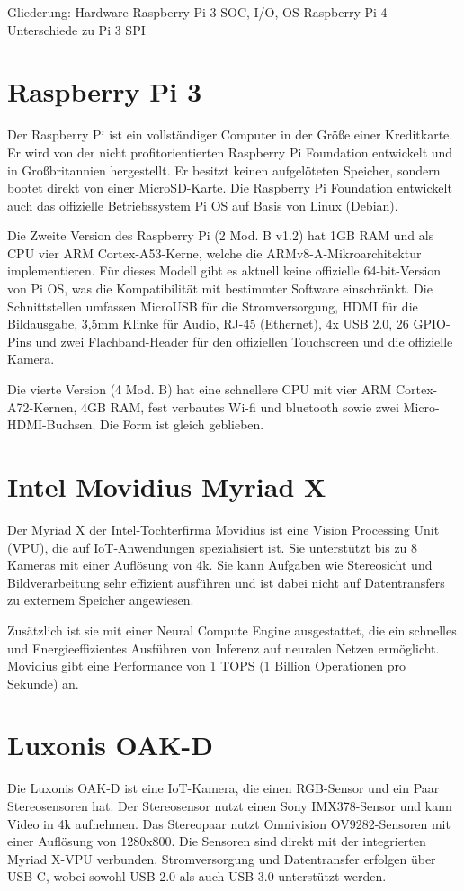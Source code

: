 Gliederung:
    Hardware
        Raspberry Pi 3
            SOC, I/O, OS
        Raspberry Pi 4
            Unterschiede zu Pi 3
        SPI
        
        
    


\chapter{Raspberry Pi 3}
Der Raspberry Pi ist ein vollständiger Computer in der Größe einer Kreditkarte. Er wird von der nicht profitorientierten Raspberry Pi Foundation entwickelt und in Großbritannien hergestellt. Er besitzt keinen aufgelöteten Speicher, sondern bootet direkt von einer MicroSD-Karte. Die Raspberry Pi Foundation entwickelt auch das offizielle Betriebssystem Pi OS auf Basis von Linux (Debian).

Die Zweite Version des Raspberry Pi (2 Mod. B v1.2) hat 1GB RAM und als CPU vier ARM Cortex-A53-Kerne, welche die ARMv8-A-Mikroarchitektur implementieren. Für dieses Modell gibt es aktuell keine offizielle 64-bit-Version von Pi OS, was die Kompatibilität mit bestimmter Software einschränkt.
Die Schnittstellen umfassen MicroUSB für die Stromversorgung, HDMI für die Bildausgabe, 3,5mm Klinke für Audio, RJ-45 (Ethernet), 4x USB 2.0, 26 GPIO-Pins und zwei Flachband-Header für den offiziellen Touchscreen und die offizielle Kamera.

Die vierte Version (4 Mod. B) hat eine schnellere CPU mit vier ARM Cortex-A72-Kernen, 4GB RAM, fest verbautes Wi-fi und bluetooth sowie zwei Micro-HDMI-Buchsen. Die Form ist gleich geblieben.

\chapter{Intel Movidius Myriad X}
Der Myriad X der Intel-Tochterfirma Movidius ist eine Vision Processing Unit (VPU), die auf IoT-Anwendungen spezialisiert ist. Sie unterstützt bis zu 8 Kameras mit einer Auflösung von 4k. Sie kann Aufgaben wie Stereosicht und Bildverarbeitung sehr effizient ausführen und ist dabei nicht auf Datentransfers zu externem Speicher angewiesen.

Zusätzlich ist sie mit einer Neural Compute Engine ausgestattet, die ein schnelles und Energieeffizientes Ausführen von Inferenz auf neuralen Netzen ermöglicht. Movidius gibt eine Performance von 1 TOPS (1 Billion Operationen pro Sekunde) an.

\chapter{Luxonis OAK-D}
Die Luxonis OAK-D ist eine IoT-Kamera, die einen RGB-Sensor und ein Paar Stereosensoren hat. Der Stereosensor nutzt einen Sony IMX378-Sensor und kann Video in 4k aufnehmen. Das Stereopaar nutzt Omnivision OV9282-Sensoren mit einer Auflösung von 1280x800.
Die Sensoren sind direkt mit der integrierten Myriad X-VPU verbunden. Stromversorgung und Datentransfer erfolgen über USB-C, wobei sowohl USB 2.0 als auch USB 3.0 unterstützt werden.

